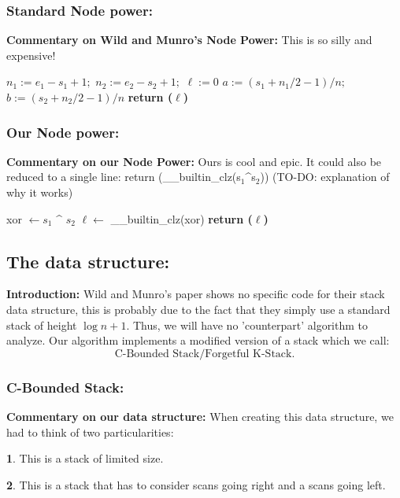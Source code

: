 \documentclass{article}
\begin{document}
\subsubsection{Standard Node power:}
\textbf{Commentary on Wild and Munro's Node Power:} This is so silly and expensive! 
\begin{algorithm2e}
\caption{NodePower($s_1, e_1, s_2, e_2, n$)}\label{np1}
$n_1 := e_1 - s_1 + 1;$ \text{ } $n_2 := e_2 - s_2 + 1;$ \text{ } $\ell := 0$\;
$a := (s_1 + n_1/2 - 1)/n;$ \text{ } $b := (s_2 + n_2/2 - 1)/n$\;
\textbf{return ($\ell$)}
\end{algorithm2e}
\subsubsection{Our Node power:}
\textbf{Commentary on our Node Power:} Ours is cool and epic.
It could also be reduced to a single line:
return (\_{\_{}}builtin\_{}clz(s$_1$\^{}s$_2$))
(TO-DO: explanation of why it works) 
\begin{algorithm2e}
\caption{NodePower($s_1, s_2$)}\label{np2}
xor $\gets s_1$ \textbf{\^{}} $s_2$\;
$\ell \gets$ \_{\_{}}builtin\_{}clz(xor)\;
\textbf{return ($\ell$)}\;
\end{algorithm2e}
\subsection{The data structure:}
\textbf{Introduction:} Wild and Munro's paper shows no specific code for their stack data structure,
this is probably due to the fact that they simply use a standard stack of height $\log n + 1$.
Thus, we will have no 'counterpart' algorithm to analyze. Our algorithm implements a modified version of a stack which
we call:
\begin{equation*}
    \text{C-Bounded Stack/Forgetful K-Stack.}
\end{equation*}

\subsubsection{C-Bounded Stack:}
\noindent\textbf{Commentary on our data structure:} 
When creating this data structure, we had to think of two particularities:

\noindent \textbf{1}. This is a stack of limited size.

\noindent \textbf{2}. This is a stack that has to consider scans going right and a scans going left.
\end{document}
